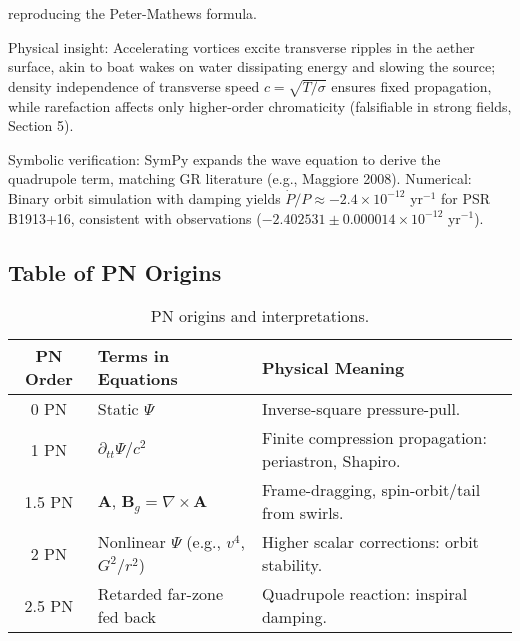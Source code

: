 \documentclass{article}
\begin{document}
reproducing the Peter-Mathews formula.

Physical insight: Accelerating vortices excite transverse ripples in the aether surface, akin to boat wakes on water dissipating energy and slowing the source; density independence of transverse speed $c = \sqrt{T / \sigma}$ ensures fixed propagation, while rarefaction affects only higher-order chromaticity (falsifiable in strong fields, Section 5).

Symbolic verification: SymPy expands the wave equation to derive the quadrupole term, matching GR literature (e.g., Maggiore 2008). Numerical: Binary orbit simulation with damping yields $\dot{P}/P \approx -2.4 \times 10^{-12}$ yr$^{-1}$ for PSR B1913+16, consistent with observations ($-2.402531 \pm 0.000014 \times 10^{-12}$ yr$^{-1}$).

\medskip
\noindent
{}
\medskip

\subsection{Table of PN Origins}

\begin{table}[h!]
\centering
\begin{tabular}{|c|l|l|}
\hline
PN Order & Terms in Equations & Physical Meaning \\
\hline
0 PN & Static $\Psi$ & Inverse-square pressure-pull. \\
1 PN & $\partial_{tt} \Psi / c^2$ & Finite compression propagation: periastron, Shapiro. \\
1.5 PN & $\mathbf{A}$, $\mathbf{B}_g = \nabla \times \mathbf{A}$ & Frame-dragging, spin-orbit/tail from swirls. \\
2 PN & Nonlinear $\Psi$ (e.g., $v^4$, $G^2 / r^2$) & Higher scalar corrections: orbit stability. \\
2.5 PN & Retarded far-zone fed back & Quadrupole reaction: inspiral damping. \\
\hline
\end{tabular}
\caption{PN origins and interpretations.}
\end{table}
\end{document}
